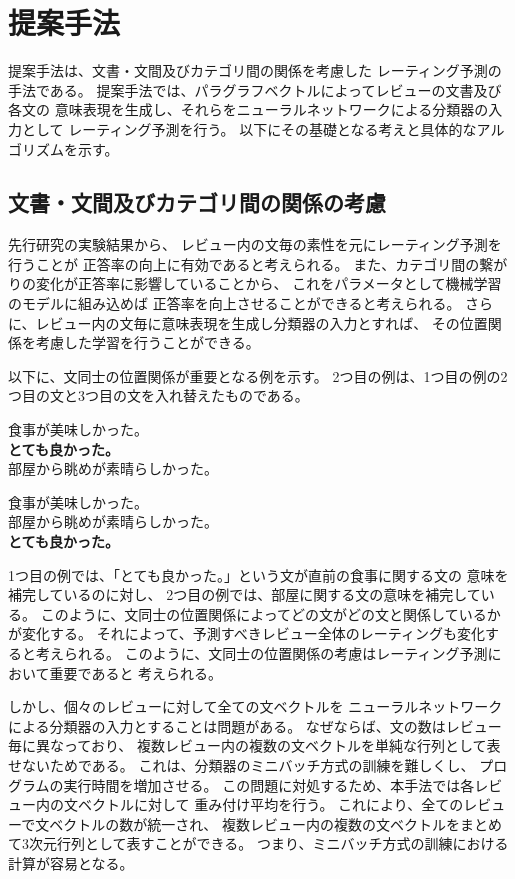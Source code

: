 \section{提案手法} \label{sec:ProposedMethod}

提案手法は、文書・文間及びカテゴリ間の関係を考慮した
レーティング予測の手法である。
提案手法では、パラグラフベクトルによってレビューの文書及び各文の
意味表現を生成し、それらをニューラルネットワークによる分類器の入力として
レーティング予測を行う。
以下にその基礎となる考えと具体的なアルゴリズムを示す。


\subsection{文書・文間及びカテゴリ間の関係の考慮}

先行研究\cite{fujitani15}の実験結果から、
レビュー内の文毎の素性を元にレーティング予測を行うことが
正答率の向上に有効であると考えられる。
また、カテゴリ間の繋がりの変化が正答率に影響していることから、
これをパラメータとして機械学習のモデルに組み込めば
正答率を向上させることができると考えられる。
さらに、レビュー内の文毎に意味表現を生成し分類器の入力とすれば、
その位置関係を考慮した学習を行うことができる。

以下に、文同士の位置関係が重要となる例を示す。
2つ目の例は、1つ目の例の2つ目の文と3つ目の文を入れ替えたものである。
\begin{addmargin}{8ex}
  \vspace{1em}
  食事が美味しかった。 \\
  \textbf{とても良かった。} \\
  部屋から眺めが素晴らしかった。
\end{addmargin}
\begin{addmargin}{8ex}
  \vspace{1em}
  食事が美味しかった。 \\
  部屋から眺めが素晴らしかった。 \\
  \textbf{とても良かった。}
\end{addmargin}
1つ目の例では、「とても良かった。」という文が直前の食事に関する文の
意味を補完しているのに対し、
2つ目の例では、部屋に関する文の意味を補完している。
このように、文同士の位置関係によってどの文がどの文と関係しているかが変化する。
それによって、予測すべきレビュー全体のレーティングも変化すると考えられる。
このように、文同士の位置関係の考慮はレーティング予測において重要であると
考えられる。

しかし、個々のレビューに対して全ての文ベクトルを
ニューラルネットワークによる分類器の入力とすることは問題がある。
なぜならば、文の数はレビュー毎に異なっており、
複数レビュー内の複数の文ベクトルを単純な行列として表せないためである。
これは、分類器のミニバッチ方式の訓練を難しくし、
プログラムの実行時間を増加させる。
この問題に対処するため、本手法では各レビュー内の文ベクトルに対して
重み付け平均を行う。
これにより、全てのレビューで文ベクトルの数が統一され、
複数レビュー内の複数の文ベクトルをまとめて3次元行列として表すことができる。
つまり、ミニバッチ方式の訓練における計算が容易となる。

